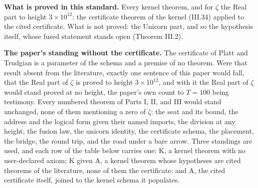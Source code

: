 \documentclass[10pt,twocolumn]{article}
\begin{document}
\textbf{What is proved in this standard.} Every kernel theorem, and for
\(\zeta\) the Real part to height \(3 \times 10^{12}\): the certificate
theorem of the kernel (III.34) applied to the cited certificate. What is
not proved: the Unicorn part, and so the hypothesis itself, whose fused
statement stands open (Theorem III.2).

\textbf{The paper's standing without the certificate.} The certificate
of Platt and Trudgian is a parameter of the schema and a premise of no
theorem. Were that result absent from the literature, exactly one
sentence of this paper would fall, that the Real part of \(\zeta\) is
proved to height \(3 \times 10^{12}\), and with it the Real part of
\(\zeta\) would stand proved at no height, the paper's own count to
\(T = 100\) being testimony. Every numbered theorem of Parts I, II, and
III would stand unchanged, none of them mentioning a zero of \(\zeta\):
the seat and its bound, the address and the logical form given their
named imports, the division at any height, the fusion law, the unicorn
identity, the certificate schema, the placement, the bridge, the round
trip, and the road under a bare arrow. Three standings are used, and
each row of the table below carries one: K, a kernel theorem with no
user-declared axiom; K given A, a kernel theorem whose hypotheses are
cited theorems of the literature, none of them the certificate; and A,
the cited certificate itself, joined to the kernel schema it populates.
\end{document}

